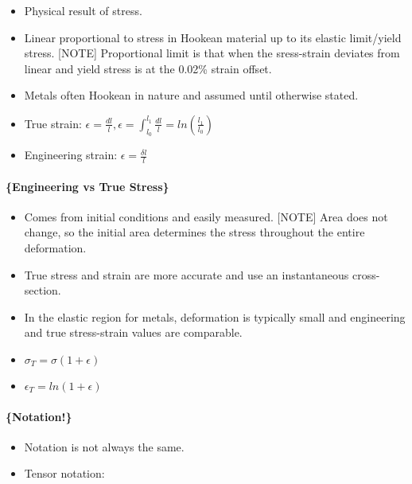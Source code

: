 \documentclass[
]{article}
\providecommand{\tightlist}{%
  \setlength{\itemsep}{0pt}\setlength{\parskip}{0pt}}
\begin{document}
\begin{itemize}
\tightlist
\item
  Physical result of stress.
\item
  Linear proportional to stress in Hookean material up to its elastic
  limit/yield stress. {[}NOTE{]} Proportional limit is that when the
  sress-strain deviates from linear and yield stress is at the 0.02\%
  strain offset.
\item
  Metals often Hookean in nature and assumed until otherwise stated.
\item
  True strain:
  \(\epsilon = \frac{dl}{l}, \epsilon = \int_{l_{0}}^{l_{1}}\frac{dl}{l} = ln(\frac{l_{1}}{l_{0}})\)
\item
  Engineering strain: \(\epsilon = \frac{\delta l}{l}\)
\end{itemize}

\hypertarget{engineering-vs-true-stress}{%
\paragraph{\{Engineering vs True
Stress\}}\label{engineering-vs-true-stress}}

\begin{itemize}
\tightlist
\item
  Comes from initial conditions and easily measured. {[}NOTE{]} Area
  does not change, so the initial area determines the stress throughout
  the entire deformation.
\item
  True stress and strain are more accurate and use an instantaneous
  cross-section.
\item
  In the elastic region for metals, deformation is typically small and
  engineering and true stress-strain values are comparable.
\item
  \(\sigma_{T} = \sigma(1 + \epsilon)\)
\item
  \(\epsilon_{T} = ln(1 + \epsilon)\)
\end{itemize}

{}

\hypertarget{notation}{%
\paragraph{\{Notation!\}}\label{notation}}

\begin{itemize}
\tightlist
\item
  Notation is not always the same.
\item
  Tensor notation:
\end{itemize}
\end{document}
